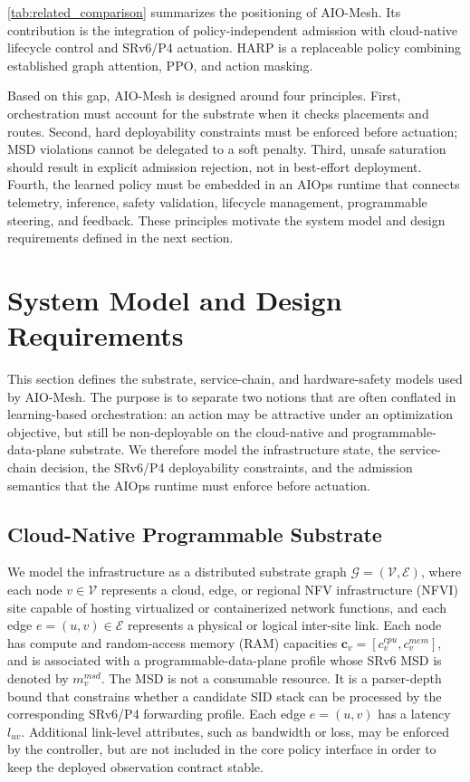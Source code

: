\documentclass[final,5p]{elsarticle}
\newcommand{\rev}[1]{\textcolor{revisiongreen}{#1}}
\let\newrev\rev
\begin{document}
\autoref{tab:related_comparison} summarizes the positioning of AIO-Mesh. \rev{Its contribution is the integration of policy-independent admission with cloud-native lifecycle control and SRv6/P4 actuation. HARP is a replaceable policy combining established graph attention, PPO, and action masking.}

Based on this gap, AIO-Mesh is designed around four principles. \newrev{First, orchestration must account for the substrate when it checks placements and routes.} Second, hard deployability constraints must be enforced before actuation; MSD violations cannot be delegated to a soft penalty. Third, unsafe saturation should result in explicit admission rejection, not in best-effort deployment. Fourth, the learned policy must be embedded in an AIOps runtime that connects telemetry, inference, safety validation, lifecycle management, programmable steering, and feedback. These principles motivate the system model and design requirements defined in the next section.

\section{System Model and Design Requirements}
\label{sec:system_model}

This section defines the substrate, service-chain, and hardware-safety models used by AIO-Mesh. The purpose is to separate two notions that are often conflated in learning-based orchestration: an action may be attractive under an optimization objective, but still be non-deployable on the cloud-native and programmable-data-plane substrate. We therefore model the infrastructure state, the service-chain decision, the SRv6/P4 deployability constraints, and the admission semantics that the AIOps runtime must enforce before actuation.

\subsection{Cloud-Native Programmable Substrate}
\label{subsec:infrastructure_model}

We model the infrastructure as a distributed substrate graph $\mathcal{G}=(\mathcal{V},\mathcal{E})$, where each node \(v\in\mathcal{V}\) represents a cloud, edge, or regional \rev{NFV infrastructure (NFVI)} site capable of hosting virtualized or containerized network functions, and each edge \(e=(u,v)\in\mathcal{E}\) represents a physical or logical inter-site link. Each node has compute and \newrev{random-access memory (RAM)} capacities $\mathbf{c}_v=\left[c_v^{cpu},c_v^{mem}\right]$, and is associated with a programmable-data-plane profile whose SRv6 \rev{MSD} is denoted by \(m_v^{msd}\). The MSD is not a consumable resource. It is a parser-depth bound that constrains whether a candidate SID stack can be processed by the corresponding SRv6/P4 forwarding profile. Each edge \(e=(u,v)\) has a latency \(l_{uv}\). Additional link-level attributes, such as bandwidth or loss, may be enforced by the controller, but are not included in the core policy interface in order to keep the deployed observation contract stable.
\end{document}
